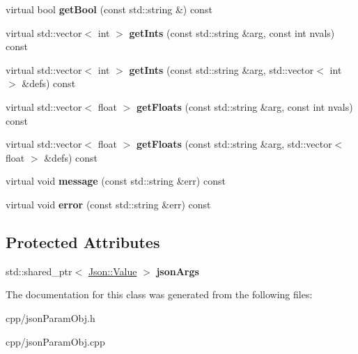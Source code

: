 \begin{DoxyCompactItemize}
\mbox{\label{class_s_e_p_1_1json_param_obj_a043f2078e119358395987ba1d707bb1e}} 
virtual bool {\bfseries get\+Bool} (const std\+::string \&) const
\item 
\mbox{\label{class_s_e_p_1_1json_param_obj_ad43091744a8c0df872c9f126931d4500}} 
virtual std\+::vector$<$ int $>$ {\bfseries get\+Ints} (const std\+::string \&arg, const int nvals) const
\item 
\mbox{\label{class_s_e_p_1_1json_param_obj_a76761857cb56954b8cf64230d4ea55fd}} 
virtual std\+::vector$<$ int $>$ {\bfseries get\+Ints} (const std\+::string \&arg, std\+::vector$<$ int $>$ \&defs) const
\item 
\mbox{\label{class_s_e_p_1_1json_param_obj_a7715e042a57ce3fe35c32daccff82b59}} 
virtual std\+::vector$<$ float $>$ {\bfseries get\+Floats} (const std\+::string \&arg, const int nvals) const
\item 
\mbox{\label{class_s_e_p_1_1json_param_obj_abbd50b67073fb399e369b6658cfa10db}} 
virtual std\+::vector$<$ float $>$ {\bfseries get\+Floats} (const std\+::string \&arg, std\+::vector$<$ float $>$ \&defs) const
\item 
\mbox{\label{class_s_e_p_1_1json_param_obj_ab36226e15d6f57bd8e032fa6f656d49a}} 
virtual void {\bfseries message} (const std\+::string \&err) const
\item 
\mbox{\label{class_s_e_p_1_1json_param_obj_a8372af69da55524f268bbbcb639380aa}} 
virtual void {\bfseries error} (const std\+::string \&err) const
\end{DoxyCompactItemize}
\subsection*{Protected Attributes}
\begin{DoxyCompactItemize}
\item 
\mbox{\label{class_s_e_p_1_1json_param_obj_a6cedf381fcec788a0db261a22cb0704c}} 
std\+::shared\+\_\+ptr$<$ \hyperlink{class_json_1_1_value}{Json\+::\+Value} $>$ {\bfseries json\+Args}
\end{DoxyCompactItemize}


The documentation for this class was generated from the following files\+:\begin{DoxyCompactItemize}
\item 
cpp/json\+Param\+Obj.\+h\item 
cpp/json\+Param\+Obj.\+cpp\end{DoxyCompactItemize}
